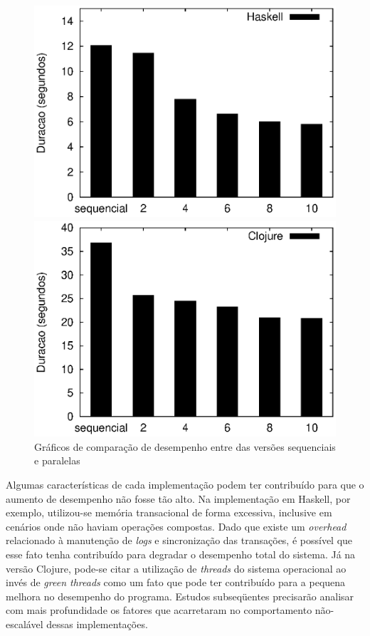\begin{figure}[h]
 \begin{minipage}{0.5\textwidth}
  \centering
  \includegraphics[scale=0.63]{imagens/haskell.eps}
 \end{minipage}
 \begin{minipage}{0.5\textwidth}
  \includegraphics[scale=0.63]{imagens/clojure.eps}
 \end{minipage}
 \caption{Gráficos de comparação de desempenho entre das versões sequenciais e paralelas}
 \label{fig:clj-hs}
\end{figure}

Algumas características de cada implementação podem ter contribuído para que o aumento de desempenho não fosse tão alto. Na implementação em Haskell, por exemplo, utilizou-se memória transacional de forma excessiva, inclusive em cenários onde não haviam operações compostas. Dado que existe um \emph{overhead} relacionado à manutenção de \emph{logs} e sincronização das transações, é possível que esse fato tenha contribuído para degradar o desempenho total do sistema. Já na versão Clojure, pode-se citar a utilização de \emph{threads} do sistema operacional ao invés de \emph{green threads} como um fato que pode ter contribuído para a pequena melhora no desempenho do programa. Estudos subseqüentes precisarão analisar com mais profundidade os fatores que acarretaram no comportamento não-escalável dessas implementações.

